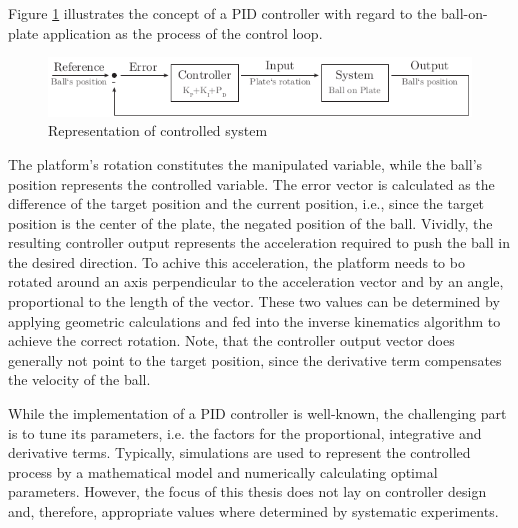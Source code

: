 Figure \ref{fig:pid_rep} illustrates the concept of a \ac{PID} controller with
regard to the ball-on-plate application as the process of the control loop.
\begin{figure}
	\centering
	\centering
	\includegraphics{../figures/pid_rep}
	\caption{Representation of controlled system}
	\label{fig:pid_rep}
\end{figure}
The platform's rotation constitutes the manipulated variable, while the ball's
position represents the controlled variable. The error vector is calculated as
the difference of the target position and the current position, i.e., since
the target position is the center of the plate, the negated position of the
ball. Vividly, the resulting controller output represents the acceleration
required to push the ball in the desired direction. To achive this
acceleration, the platform needs to bo rotated around an axis perpendicular to
the acceleration vector and by an angle, proportional to the length of the
vector. These two values can be determined by applying geometric calculations
and fed into the inverse kinematics algorithm to achieve the correct rotation.
Note, that the controller output vector does generally not point to the target
position, since the derivative term compensates the velocity of the ball.

While the implementation of a \ac{PID} controller is well-known, the
challenging part is to tune its parameters, i.e. the factors for the
proportional, integrative and derivative terms. Typically, simulations are
used to represent the controlled process by a mathematical model and
numerically calculating optimal parameters. However, the focus of this thesis
does not lay on controller design and, therefore, appropriate values where
determined by systematic experiments.

